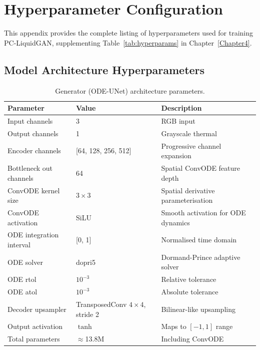 \chapter{Hyperparameter Configuration}
\label{AppendixA}

This appendix provides the complete listing of hyperparameters used for training PC-LiquidGAN, supplementing Table~\ref{tab:hyperparams} in Chapter~\ref{Chapter4}.

\section{Model Architecture Hyperparameters}

\begin{table}[htbp]
\centering
\caption{Generator (ODE-UNet) architecture parameters.}
\label{tab:app_gen}
\begin{tabular}{lll}
\toprule
\textbf{Parameter} & \textbf{Value} & \textbf{Description} \\
\midrule
Input channels & 3 & RGB input \\
Output channels & 1 & Grayscale thermal \\
Encoder channels & [64, 128, 256, 512] & Progressive channel expansion \\
Bottleneck out channels & 64 & Spatial ConvODE feature depth \\
ConvODE kernel size & $3 \times 3$ & Spatial derivative parameterisation \\
ConvODE activation & SiLU & Smooth activation for ODE dynamics \\
ODE integration interval & [0, 1] & Normalised time domain \\
ODE solver & dopri5 & Dormand-Prince adaptive solver \\
ODE rtol & $10^{-3}$ & Relative tolerance \\
ODE atol & $10^{-3}$ & Absolute tolerance \\
Decoder upsampler & TransposedConv $4\times4$, stride 2 & Bilinear-like upsampling \\
Output activation & $\tanh$ & Maps to $[-1, 1]$ range \\
Total parameters & $\approx$13.8M & Including ConvODE \\
\bottomrule
\end{tabular}
\end{table}

